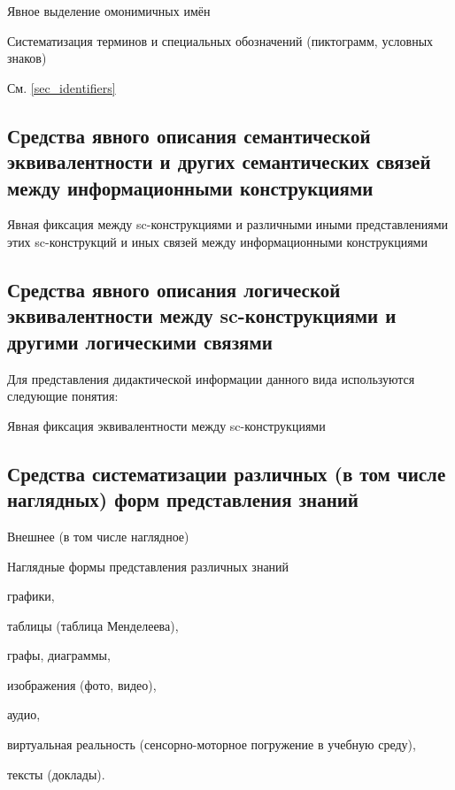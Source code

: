 Явное выделение омонимичных имён

Систематизация терминов и специальных обозначений (пиктограмм, условных знаков)

См. \ref{sec_identifiers}~


\newpage
\subsection{Средства явного описания семантической эквивалентности и других семантических связей между информационными конструкциями}
\label{subsec_means_explicitly_describing_semantic_equivalence_other_semantic_relationships_between_information_constructs}
Явная фиксация  между sc-конструкциями и различными иными представлениями этих sc-конструкций и иных  связей между информационными конструкциями

\newpage
\subsection{Средства явного описания логической эквивалентности между sc-конструкциями и другими логическими связями}
\label{subsec_means_explicit_description_logical_equivalence_between_sc-constructions}
Для представления дидактической информации данного вида используются следующие понятия:

\begin{SCn}
\end{SCn}

Явная фиксация  эквивалентности между sc-конструкциями


\newpage
\subsection{Средства систематизации различных (в том числе наглядных) форм представления знаний}
\label{subsec_means_systematization_various_forms_knowledge_representation}
Внешнее (в том числе наглядное)

Наглядные формы представления различных знаний
\begin{textitemize}
	\item графики,
	\item таблицы (таблица Менделеева),
	\item графы, диаграммы,
	\item изображения (фото, видео),
	\item аудио,
	\item виртуальная реальность (сенсорно-моторное погружение в учебную среду),
	\item тексты (доклады).
\end{textitemize}

